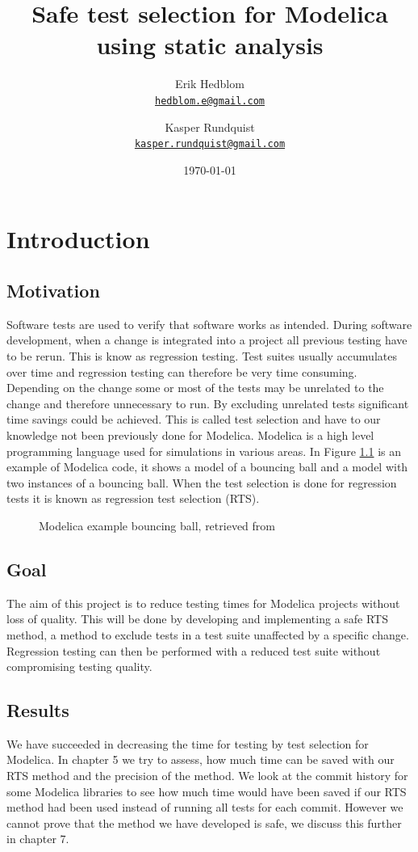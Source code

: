 \documentclass{cslthse-msc}
\author{
	Erik Hedblom \\
	{\normalsize \href{mailto:hedblom.e@gmail.com}{\texttt{hedblom.e@gmail.com}}}
	\and
	Kasper Rundquist \\
	{\normalsize \href{mailto:kasper.rundquist@gmail.com}{\texttt{kasper.rundquist@gmail.com}}}
}
\title{Safe test selection for Modelica using static analysis}
\date{\today}
\begin{document}
\makefrontmatter
\chapter[Introduction]{Introduction}


\section{Motivation}
Software tests are used to verify that software works as intended.
During software development, when a change is integrated into a project all previous testing have to be rerun. \cite{DBLP:conf/sigsoft/LegunsenHSLZM16, haider2016safe} This is know as regression testing. Test suites usually accumulates over time and regression testing can therefore be very time consuming. Depending on the change some or most of the tests may be unrelated to the change and therefore unnecessary to run. By excluding unrelated tests significant time savings could be achieved. This is called test selection and have to our knowledge not been previously done for Modelica. Modelica is a high level programming language used for simulations in various areas. In Figure \ref{fig:bouncingBallCode} is an example of Modelica code, it shows a model of a bouncing ball and a model with two instances of a bouncing ball. When the test selection is done for regression tests it is known as regression test selection (RTS). 

\begin{figure}[!htbp]
    \centering
    {}
    \caption{Modelica example bouncing ball, retrieved from \cite{aakesson2010implementation}}
    \label{fig:bouncingBallCode}
\end{figure}

\section{Goal}
The aim of this project is to reduce testing times for Modelica projects without loss of quality. This will be done by developing and implementing a safe RTS method, a method to exclude tests in a test suite unaffected by a specific change. \cite{DBLP:conf/pppj/OqvistHM16} Regression testing can then be performed with a reduced test suite without compromising testing quality.

\section{Results}
We have succeeded in decreasing the time for testing by test selection for Modelica. In chapter 5 we try to assess, how much time can be saved with our RTS method and the precision of the method. We look at the commit history for some Modelica libraries to see how much time would have been saved if our RTS method had been used instead of running all tests for each commit. However we cannot prove that the method we have developed is safe, we discuss this further in chapter 7.
\end{document}
